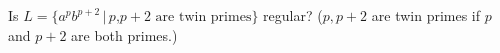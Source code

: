 Is $L = \{a^p b^{p+2}\,|\, \text{$p$,$p+2$ are twin primes} \}$ regular?
($p,p+2$ are twin primes if $p$ and $p+2$ are both primes.)
